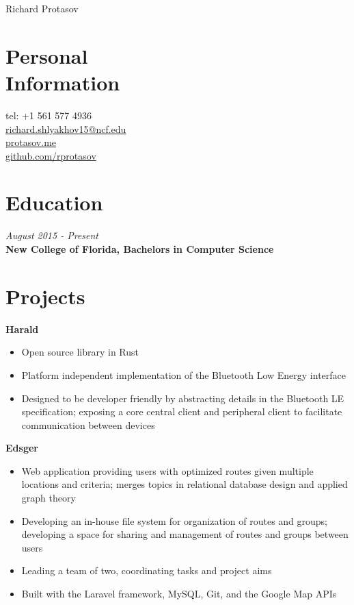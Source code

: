 \documentclass[margin,line,a4paper]{resume}
\begin{document}
{\sc \Huge Richard Protasov}
\begin{resume}
    \vspace{0.5cm}

    \section{\mysidestyle Personal\\Information}%
    tel: +1 561 577 4936 \\
    \href{mailto:richard.shlyakhov15@ncf.edu}{richard.shlyakhov15@ncf.edu} \\
    \href{https://protasov.me}{protasov.me}\\
    \href{https://github.com/rprotasov}{github.com/rprotasov}
    
    \section{\mysidestyle Education}
        \textit{August 2015 - Present}\\
        \textbf{New College of Florida, Bachelors in Computer Science}
        
    \section{\mysidestyle Projects}
        \textbf{Harald}
        \begin{itemize}
            \item Open source library in Rust
            \item Platform independent implementation of the Bluetooth Low Energy interface
            \item Designed to be developer friendly by abstracting details in the Bluetooth LE specification; exposing a core central client and peripheral client to facilitate communication between devices
        \end{itemize}
        
        \textbf{Edsger}
        \begin{itemize}
            \item Web application providing users with optimized routes given multiple locations and criteria; merges topics in relational database design and applied graph theory
            \item Developing an in-house file system for organization of routes and groups; developing a space for sharing and management of routes and groups between users
            \item Leading a team of two, coordinating tasks and project aims
            \item Built with the Laravel framework, MySQL, Git, and the Google Map APIs
        \end{itemize}
    

\end{resume}
\end{document}
